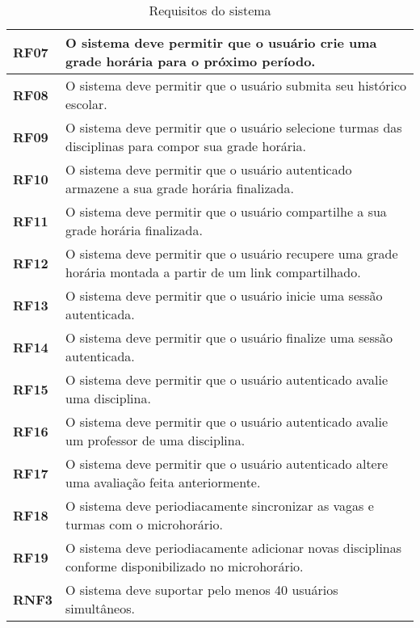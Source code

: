 \begin{table}[!ht]
    \begin{center}
        \begin{tabular}{ | m{} | p{} | }  
            \hline
            \textbf{RF07} & O sistema deve permitir que o usuário crie uma grade horária para o próximo período.\tabularnewline\hline
            \textbf{RF08} & O sistema deve permitir que o usuário submita seu histórico escolar.\tabularnewline\hline
            \textbf{RF09} & O sistema deve permitir que o usuário selecione turmas das disciplinas para compor sua grade horária.\tabularnewline\hline
            \textbf{RF10} & O sistema deve permitir que o usuário autenticado armazene a sua grade horária finalizada.\tabularnewline\hline
            \textbf{RF11} & O sistema deve permitir que o usuário compartilhe a sua grade horária finalizada. \tabularnewline\hline
            \textbf{RF12} & O sistema deve permitir que o usuário recupere uma grade horária montada a partir de um link compartilhado.\tabularnewline\hline
            
            \textbf{RF13} & O sistema deve permitir que o usuário inicie uma sessão autenticada.\tabularnewline\hline
            \textbf{RF14} & O sistema deve permitir que o usuário finalize uma sessão autenticada.\tabularnewline\hline
            \textbf{RF15} & O sistema deve permitir que o usuário autenticado avalie uma disciplina.\tabularnewline\hline
            \textbf{RF16} & O sistema deve permitir que o usuário autenticado avalie um professor de uma disciplina.\tabularnewline\hline
            \textbf{RF17} & O sistema deve permitir que o usuário autenticado altere uma avaliação feita anteriormente.\tabularnewline\hline

            \textbf{RF18} & O sistema deve periodiacamente sincronizar as vagas e turmas com o microhorário.\tabularnewline\hline
            \textbf{RF19} & O sistema deve periodiacamente adicionar novas disciplinas conforme disponibilizado no microhorário.\tabularnewline\hline

            \textbf{RNF3} & O sistema deve suportar pelo menos 40 usuários simultâneos.\tabularnewline\hline
        
        \end{tabular}
    \end{center}
    \caption{Requisitos do sistema}
    
    \label{tab:req-sistema}
\end{table}
